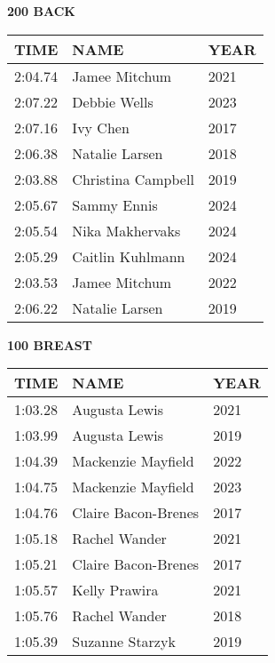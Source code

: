 \begin{table}[H]
\centering
\begin{minipage}[t]{0.48\textwidth}
\centering
\textbf{200 BACK}\\[0.1cm]
\begin{tabular}{@{}p{1.8cm}p{2.8cm}p{1.2cm}@{}}
\hline
    \textbf{TIME} & \textbf{NAME} & \textbf{YEAR} \\
\hline
    2:04.74 & Jamee Mitchum & 2021 \\
    2:07.22 & Debbie Wells & 2023 \\
    2:07.16 & Ivy Chen & 2017 \\
    2:06.38 & Natalie Larsen & 2018 \\
    2:03.88 & Christina Campbell & 2019 \\
    2:05.67 & Sammy Ennis & 2024 \\
    2:05.54 & Nika Makhervaks & 2024 \\
    2:05.29 & Caitlin Kuhlmann & 2024 \\
    2:03.53 & Jamee Mitchum & 2022 \\
    2:06.22 & Natalie Larsen & 2019 \\
\hline
\end{tabular}
\end{minipage}\hfill
\begin{minipage}[t]{0.48\textwidth}
\centering
\textbf{100 BREAST}\\[0.1cm]
\begin{tabular}{@{}p{1.8cm}p{2.8cm}p{1.2cm}@{}}
\hline
    \textbf{TIME} & \textbf{NAME} & \textbf{YEAR} \\
\hline
    1:03.28 & Augusta Lewis & 2021 \\
    1:03.99 & Augusta Lewis & 2019 \\
    1:04.39 & Mackenzie Mayfield & 2022 \\
    1:04.75 & Mackenzie Mayfield & 2023 \\
    1:04.76 & Claire Bacon-Brenes & 2017 \\
    1:05.18 & Rachel Wander & 2021 \\
    1:05.21 & Claire Bacon-Brenes & 2017 \\
    1:05.57 & Kelly Prawira & 2021 \\
    1:05.76 & Rachel Wander & 2018 \\
    1:05.39 & Suzanne Starzyk & 2019 \\
\hline
\end{tabular}
\end{minipage}
\end{table}

